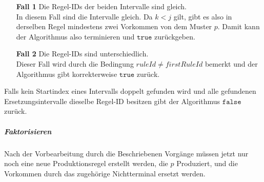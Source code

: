 \begin{enumerate}
	\item[\textbf{Fall 1}] Die Regel-IDs der beiden Intervalle sind gleich.\\
	In diesem Fall sind die Intervalle gleich. Da $k < j$ gilt, gibt es also in derselben Regel mindestens zwei Vorkommen von dem Muster $p$. Damit kann der Algorithmus also terminieren und $\texttt{true}$ zurückgeben.
	\item[\textbf{Fall 2}] Die Regel-IDs sind unterschiedlich.\\
	Dieser Fall wird durch die Bedingung $ruleId \neq firstRuleId$ bemerkt und der Algorithmus gibt korrekterweise $\texttt{true}$ zurück.
\end{enumerate}

Falls kein Startindex eines Intervalls doppelt gefunden wird und alle gefundenen Ersetzungsintervalle dieselbe Regel-ID besitzen gibt der Algorithmus $\texttt{false}$ zurück.

\subparagraph{Faktorisieren}

Nach der Vorbearbeitung durch die Beschriebenen Vorgänge müssen jetzt nur noch eine neue Produktionsregel erstellt werden, die $p$ Produziert, und die Vorkommen durch das zugehörige Nichtterminal ersetzt werden.


